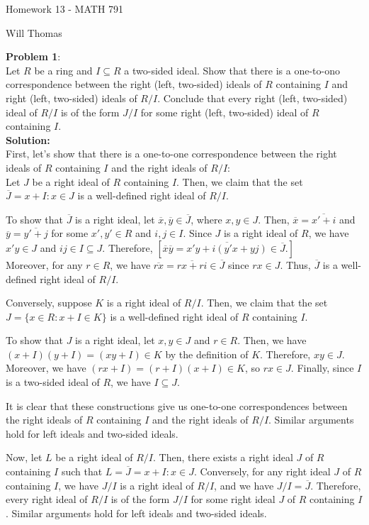 \documentclass[11pt]{article}
\newcommand{\prob}[3]{\begin{flushleft}
        \textbf{Problem #1}: \\
        #2 
		\textbf{Solution:} 
		#3

\end{flushleft}}
\newcommand{\makeHWtitle}[1]{
    \begin{center}
    \Large{Homework #1 - MATH 791} 
        \vspace{5pt}
        
        \normalsize{Will Thomas}
        \vspace{5pt}
    \end{center}
}
\begin{document}
\makeHWtitle{13}

\prob{1}{
Let $R$ be a ring and $I \subseteq R$ a two-sided ideal. Show that there is a one-to-ono correspondence between the right (left, two-sided) ideals of $R$ containing $I$ and right (left, two-sided) ideals of $R/I$. Conclude that every right (left, two-sided) ideal of $R/I$ is of the form $J/I$ for some right (left, two-sided) ideal of $R$ containing $I$. \\
}{ \\
First, let's show that there is a one-to-one correspondence between the right ideals of $R$ containing $I$ and the right ideals of $R/I$:\\
Let $J$ be a right ideal of $R$ containing $I$. Then, we claim that the set $\overline{J}={x+I: x\in J}$ is a well-defined right ideal of $R/I$.

To show that $\overline{J}$ is a right ideal, let $\overline{x},\overline{y}\in\overline{J}$, where $x,y\in J$. Then, $\overline{x}=\overline{x'+i}$ and $\overline{y}=\overline{y'+j}$ for some $x',y'\in R$ and $i,j\in I$. Since $J$ is a right ideal of $R$, we have $x'y\in J$ and $ij\in I\subseteq J$. Therefore,
$[\overline{x}\overline{y}=\overline{x'y+i(y'x+yj)}\in\overline{J}.]$ \\
Moreover, for any $r\in R$, we have $\overline{rx}=\overline{rx+ri}\in\overline{J}$ since $rx\in J$. Thus, $\overline{J}$ is a well-defined right ideal of $R/I$.

Conversely, suppose $K$ is a right ideal of $R/I$. Then, we claim that the set $J=\{x\in R: x+I\in K\}$ is a well-defined right ideal of $R$ containing $I$.

To show that $J$ is a right ideal, let $x,y\in J$ and $r\in R$. Then, we have $(x+I)(y+I)=(xy+I)\in K$ by the definition of $K$. Therefore, $xy\in J$. Moreover, we have $(rx+I)=(r+I)(x+I)\in K$, so $rx\in J$. Finally, since $I$ is a two-sided ideal of $R$, we have $I\subseteq J$.

It is clear that these constructions give us one-to-one correspondences between the right ideals of $R$ containing $I$ and the right ideals of $R/I$. Similar arguments hold for left ideals and two-sided ideals.

Now, let $L$ be a right ideal of $R/I$. Then, there exists a right ideal $J$ of $R$ containing $I$ such that $L=\overline{J}={x+I: x\in J}$. Conversely, for any right ideal $J$ of $R$ containing $I$, we have $J/I$ is a right ideal of $R/I$, and we have $J/I=\overline{J}$. Therefore, every right ideal of $R/I$ is of the form $J/I$ for some right ideal $J$ of $R$ containing $I$. Similar arguments hold for left ideals and two-sided ideals.
}
\end{document}
